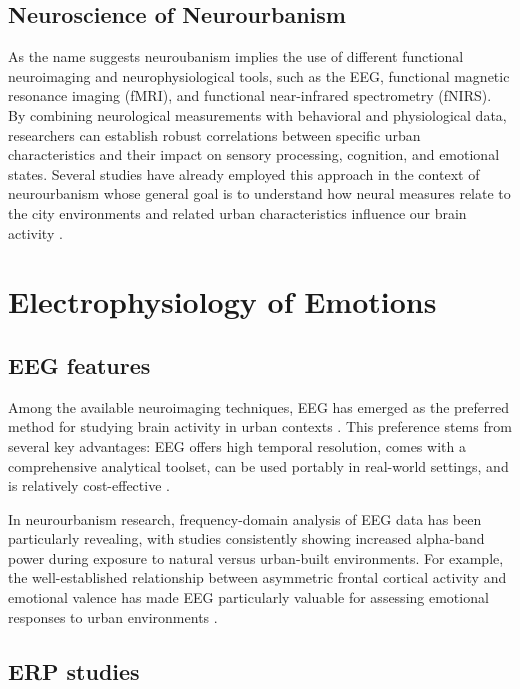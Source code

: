 \subsection{Neuroscience of Neurourbanism}

As the name suggests neuroubanism implies the use of different functional neuroimaging and neurophysiological tools, such as the EEG, functional magnetic resonance imaging (fMRI), and functional near-infrared spectrometry (fNIRS). By combining neurological measurements with behavioral and physiological data, researchers can establish robust correlations between specific urban characteristics and their impact on sensory processing, cognition, and emotional states. Several studies have already employed this approach in the context of neurourbanism whose general goal is to understand how neural measures relate to the city environments and related urban characteristics influence our brain activity \cite{ancoraCitiesNeuroscienceResearch2022, berkmanBrainMapping2013}.

\section{Electrophysiology of Emotions}
\label{section:overview}

\subsection{EEG features}

Among the available neuroimaging techniques, EEG has emerged as the preferred method for studying brain activity in urban contexts \cite{ancoraCitiesNeuroscienceResearch2022}. This preference stems from several key advantages: EEG offers high temporal resolution, comes with a comprehensive analytical toolset, can be used portably in real-world settings, and is relatively cost-effective \cite{ismailApplicationsEEGIndices2020}. 

In neurourbanism research, frequency-domain analysis of EEG data has been particularly revealing, with studies consistently showing increased alpha-band power during exposure to natural versus urban-built environments. For example, the well-established relationship between asymmetric frontal cortical activity and emotional valence has made EEG particularly valuable for assessing emotional responses to urban environments \cite{nidalEEGERPAnalysis2014}.

\subsection{ERP studies}

